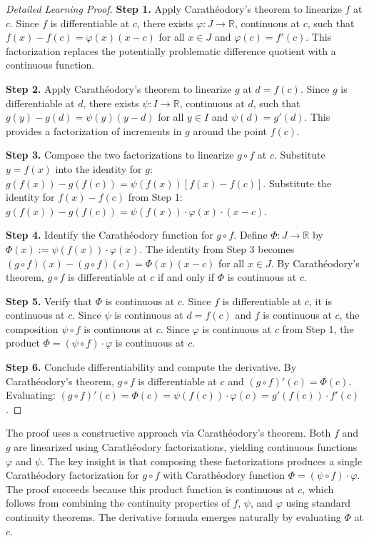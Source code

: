 \begin{proof}[Detailed Learning Proof]
\LRAProofBodyStart

\textbf{Step 1.} Apply Carath\'{e}odory's theorem to linearize $f$ at $c$. Since $f$ is differentiable at $c$, there exists $\varphi : J \to \mathbb{R}$, continuous at $c$, such that $f(x) - f(c) = \varphi(x)(x - c)$ for all $x \in J$ and $\varphi(c) = f'(c)$. This factorization replaces the potentially problematic difference quotient with a continuous function.

\textbf{Step 2.} Apply Carath\'{e}odory's theorem to linearize $g$ at $d = f(c)$. Since $g$ is differentiable at $d$, there exists $\psi : I \to \mathbb{R}$, continuous at $d$, such that $g(y) - g(d) = \psi(y)(y - d)$ for all $y \in I$ and $\psi(d) = g'(d)$. This provides a factorization of increments in $g$ around the point $f(c)$.

\textbf{Step 3.} Compose the two factorizations to linearize $g \circ f$ at $c$. Substitute $y = f(x)$ into the identity for $g$: $g(f(x)) - g(f(c)) = \psi(f(x))[f(x) - f(c)]$. Substitute the identity for $f(x) - f(c)$ from Step 1: $g(f(x)) - g(f(c)) = \psi(f(x)) \cdot \varphi(x) \cdot (x - c)$.

\textbf{Step 4.} Identify the Carath\'{e}odory function for $g \circ f$. Define $\Phi : J \to \mathbb{R}$ by $\Phi(x) := \psi(f(x)) \cdot \varphi(x)$. The identity from Step 3 becomes $(g \circ f)(x) - (g \circ f)(c) = \Phi(x)(x - c)$ for all $x \in J$. By Carath\'{e}odory's theorem, $g \circ f$ is differentiable at $c$ if and only if $\Phi$ is continuous at $c$.

\textbf{Step 5.} Verify that $\Phi$ is continuous at $c$. Since $f$ is differentiable at $c$, it is continuous at $c$. Since $\psi$ is continuous at $d = f(c)$ and $f$ is continuous at $c$, the composition $\psi \circ f$ is continuous at $c$. Since $\varphi$ is continuous at $c$ from Step 1, the product $\Phi = (\psi \circ f) \cdot \varphi$ is continuous at $c$.

\textbf{Step 6.} Conclude differentiability and compute the derivative. By Carath\'{e}odory's theorem, $g \circ f$ is differentiable at $c$ and $(g \circ f)'(c) = \Phi(c)$. Evaluating: $(g \circ f)'(c) = \Phi(c) = \psi(f(c)) \cdot \varphi(c) = g'(f(c)) \cdot f'(c)$.
\end{proof}

\begin{remark*}
The proof uses a constructive approach via Carath\'{e}odory's theorem. Both $f$ and $g$ are linearized using Carath\'{e}odory factorizations, yielding continuous functions $\varphi$ and $\psi$. The key insight is that composing these factorizations produces a single Carath\'{e}odory factorization for $g \circ f$ with Carath\'{e}odory function $\Phi = (\psi \circ f) \cdot \varphi$. The proof succeeds because this product function is continuous at $c$, which follows from combining the continuity properties of $f$, $\psi$, and $\varphi$ using standard continuity theorems. The derivative formula emerges naturally by evaluating $\Phi$ at $c$.
\end{remark*}

